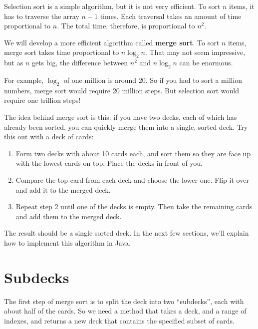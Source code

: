 
Selection sort is a simple algorithm, but it is not very efficient.
To sort $n$ items, it has to traverse the array $n-1$ times.
Each traversal takes an amount of time proportional to $n$.
The total time, therefore, is proportional to $n^2$.


We will develop a more efficient algorithm called {\bf merge sort}.
To sort $n$ items, merge sort takes time proportional to $n \log_2 n$.
That may not seem impressive, but as $n$ gets big, the difference between $n^2$ and $n \log_2 n$ can be enormous.

For example, $\log_2$ of one million is around 20.
So if you had to sort a million numbers, merge sort would require 20 million steps.
But selection sort would require one trillion steps!

The idea behind merge sort is this: if you have two decks, each of which has already been sorted, you can quickly merge them into a single, sorted deck.
Try this out with a deck of cards:

\begin{enumerate}

\item Form two decks with about 10 cards each, and sort them so they are face up with the lowest cards on top.
Place the decks in front of you.

\item Compare the top card from each deck and choose the lower one.
Flip it over and add it to the merged deck.

\item Repeat step 2 until one of the decks is empty.
Then take the remaining cards and add them to the merged deck.

\end{enumerate}

The result should be a single sorted deck.
In the next few sections, we'll explain how to implement this algorithm in Java.


\section{Subdecks}


The first step of merge sort is to split the deck into two ``subdecks'', each with about half of the cards.
So we need a method that takes a deck, and a range of indexes, and returns a new deck that contains the specified subset of cards.

